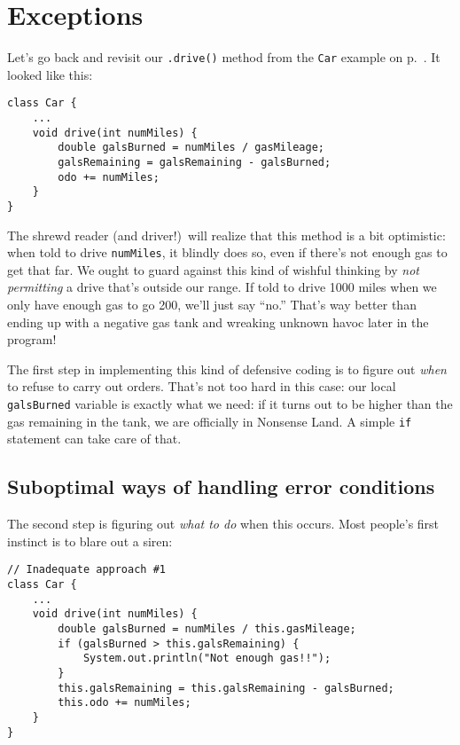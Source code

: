 \chapter{Exceptions}
\label{ch:exceptions}


Let's go back and revisit our \texttt{.drive()} method from the \texttt{Car}
example on p.~\pageref{fig:carClassCodePreExceptions}. It looked like this:

\begin{Verbatim}[fontsize=\small,samepage=true,frame=single]
class Car {
    ...
    void drive(int numMiles) {
        double galsBurned = numMiles / gasMileage;
        galsRemaining = galsRemaining - galsBurned;
        odo += numMiles;
    }
}
\end{Verbatim}

The shrewd reader (and driver!)~will realize that this method is a bit
optimistic: when told to drive \texttt{numMiles}, it blindly does so, even if
there's not enough gas to get that far. We ought to guard against this kind of
wishful thinking by \textit{not permitting} a drive that's outside our range.
If told to drive 1000 miles when we only have enough gas to go 200, we'll just
say ``no.'' That's way better than ending up with a negative gas tank and
wreaking unknown havoc later in the program!

The first step in implementing this kind of defensive coding is to figure out
\textit{when} to refuse to carry out orders. That's not too hard in this case:
our local \texttt{galsBurned} variable is exactly what we need: if it turns
out to be higher than the gas remaining in the tank, we are officially in
Nonsense Land. A simple \texttt{if} statement can take care of that.

\section{Suboptimal ways of handling error conditions}

The second step is figuring out \textit{what to do} when this occurs. Most
people's first instinct is to blare out a siren:

\begin{Verbatim}[samepage=true,fontsize=\footnotesize,frame=single]
// Inadequate approach #1
class Car {
    ...
    void drive(int numMiles) {
        double galsBurned = numMiles / this.gasMileage;
        if (galsBurned > this.galsRemaining) {
            System.out.println("Not enough gas!!");
        }
        this.galsRemaining = this.galsRemaining - galsBurned;
        this.odo += numMiles;
    }
}
\end{Verbatim}

